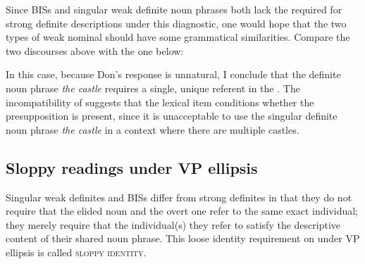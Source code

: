 \documentclass[output=paper,
modfonts
]{langscibook}
\begin{document}
Since BISs and singular weak definite noun phrases both lack the  required for strong definite descriptions under this diagnostic, one would hope that the two types of weak nominal should have some grammatical similarities. Compare the two discourses above with the one below:

\begin{exe}
\end{exe}

In this case, because Don's response is unnatural, I conclude that the definite noun phrase \textit{the castle} requires a single, unique referent in the . The incompatibility of  suggests that the lexical item conditions whether the  presupposition is present, since it is unacceptable to use the singular definite noun phrase \textit{the castle} in a context where there are multiple castles.

\subsection{Sloppy readings under VP ellipsis}\label{sec:williams:2.2} 
Singular weak definites and BISs differ from strong definites in that they do not require that the elided noun and the overt one refer to the same exact individual; they merely require that the individual(s) they refer to satisfy the descriptive content of their shared noun phrase. This loose identity requirement on  under VP ellipsis is called \textsc{sloppy identity}. 

\begin{exe}
\end{exe}
\end{document}
